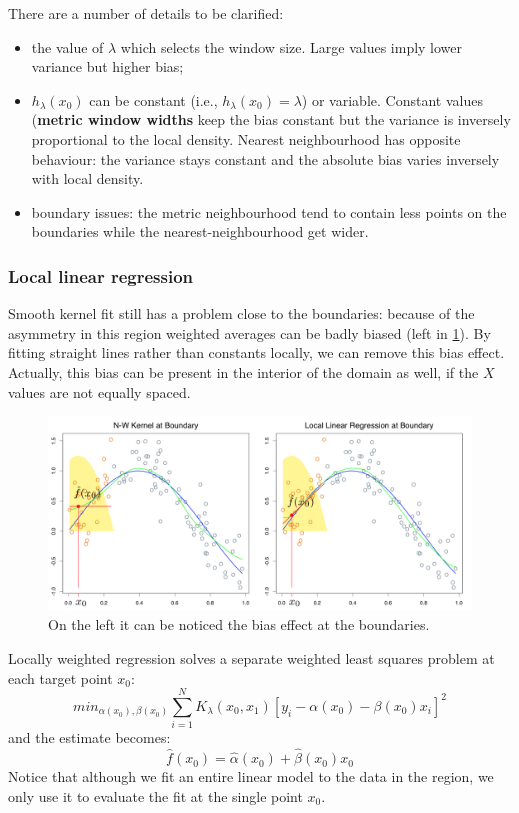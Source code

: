\documentclass[12pt, letterpaper]{article}
\theoremstyle{definition}
\begin{document}
There are a number of details to be clarified:
\begin{itemize}
\item the value of $\lambda$ which selects the window size. Large values imply lower variance but higher bias;
\item $h_\lambda(x_0)$ can be constant (i.e., $h_\lambda(x_0)=\lambda$) or variable. Constant values (\textbf{metric window widths} keep the bias constant but the variance is inversely proportional to the local density. Nearest neighbourhood has opposite behaviour: the variance stays constant and the absolute bias varies inversely with local density.
\item boundary issues: the metric neighbourhood tend to contain less points on the boundaries while the nearest-neighbourhood get wider.
\end{itemize}

\subsubsection{Local linear regression}
Smooth kernel fit still has a problem close to the boundaries: because of the asymmetry in this region weighted averages can be badly biased (left in \ref{biasedKernel}). By fitting straight lines rather than constants locally, we can remove this bias effect. Actually, this bias can be present in the interior of the domain as well, if the $X$ values are not equally spaced.
\begin{figure}
\includegraphics[scale=0.4]{img/biasedKernel}
\caption{On the left it can be noticed the bias effect at the boundaries.}
\label{biasedKernel}
\end{figure}
Locally weighted regression solves a separate weighted least squares problem at each target point $x_0$:
\begin{equation}
min_{\alpha(x_0), \beta(x_0)} \sum_{i=1}^N K_\lambda(x_0,x_1)\left[ y_i - \alpha(x_0) -\beta(x_0)x_i\right]^2
\end{equation}
and the estimate becomes:
\begin{equation}
\hat{f}(x_0) = \hat{\alpha}(x_0) + \hat{\beta}(x_0) x_0
\end{equation}
Notice that although we fit an entire linear model to the data in the region, we only use it to evaluate the fit at the single point $x_0$.
\end{document}
